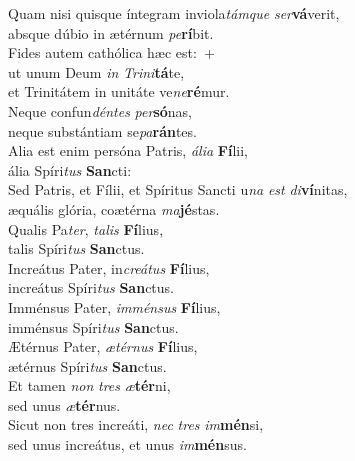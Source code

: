 \evenverse Quam nisi quisque íntegram inviola\textit{tám}\textit{que} \textit{ser}\textbf{vá}verit,~\*\\
\evenverse absque dúbio in ætérnum \textit{pe}\textbf{rí}bit.\\
\oddverse Fides autem cathólica hæc est:~+\\
\oddverse  ut unum Deum \textit{in} \textit{Tri}\textit{ni}\textbf{tá}te,~\*\\
\oddverse et Trinitátem in unitáte ve\textit{ne}\textbf{ré}mur.\\
\evenverse Neque confun\textit{dén}\textit{tes} \textit{per}\textbf{só}nas,~\*\\
\evenverse neque substántiam se\textit{pa}\textbf{rán}tes.\\
\oddverse Alia est enim persóna Patris, \textit{á}\textit{li}\textit{a} \textbf{Fí}lii,~\*\\
\oddverse ália Spíri\textit{tus} \textbf{San}cti:\\
\evenverse Sed Patris, et Fílii, et Spíritus Sancti u\textit{na} \textit{est} \textit{di}\textbf{ví}nitas,~\*\\
\evenverse æquális glória, coætérna \textit{ma}\textbf{jé}stas.\\
\oddverse Qualis Pa\textit{ter}, \textit{ta}\textit{lis} \textbf{Fí}lius,~\*\\
\oddverse talis Spíri\textit{tus} \textbf{San}ctus.\\
\evenverse Increátus Pater, in\textit{cre}\textit{á}\textit{tus} \textbf{Fí}lius,~\*\\
\evenverse increátus Spíri\textit{tus} \textbf{San}ctus.\\
\oddverse Imménsus Pater, \textit{im}\textit{mén}\textit{sus} \textbf{Fí}lius,~\*\\
\oddverse imménsus Spíri\textit{tus} \textbf{San}ctus.\\
\evenverse Ætérnus Pater, \textit{æ}\textit{tér}\textit{nus} \textbf{Fí}lius,~\*\\
\evenverse ætérnus Spíri\textit{tus} \textbf{San}ctus.\\
\oddverse Et tamen \textit{non} \textit{tres} \textit{æ}\textbf{tér}ni,~\*\\
\oddverse sed unus \textit{æ}\textbf{tér}nus.\\
\evenverse Sicut non tres increáti, \textit{nec} \textit{tres} \textit{im}\textbf{mén}si,~\*\\
\evenverse sed unus increátus, et unus \textit{im}\textbf{mén}sus.\\
